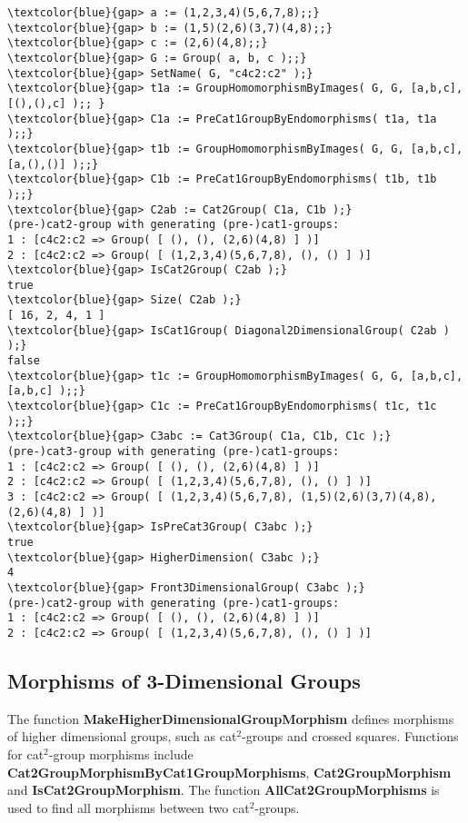 \documentclass[a4paper,11pt]{article}
\theoremstyle{plain}
\theoremstyle{definition}
\begin{document}
\begin{Verbatim}[frame=single, fontsize=\small, commandchars=\\\{\}]
\textcolor{blue}{gap> a := (1,2,3,4)(5,6,7,8);;}
\textcolor{blue}{gap> b := (1,5)(2,6)(3,7)(4,8);;}
\textcolor{blue}{gap> c := (2,6)(4,8);;}
\textcolor{blue}{gap> G := Group( a, b, c );;}
\textcolor{blue}{gap> SetName( G, "c4c2:c2" );}
\textcolor{blue}{gap> t1a := GroupHomomorphismByImages( G, G, [a,b,c], [(),(),c] );; }
\textcolor{blue}{gap> C1a := PreCat1GroupByEndomorphisms( t1a, t1a );;}
\textcolor{blue}{gap> t1b := GroupHomomorphismByImages( G, G, [a,b,c], [a,(),()] );;}
\textcolor{blue}{gap> C1b := PreCat1GroupByEndomorphisms( t1b, t1b );;}
\textcolor{blue}{gap> C2ab := Cat2Group( C1a, C1b );}
(pre-)cat2-group with generating (pre-)cat1-groups:
1 : [c4c2:c2 => Group( [ (), (), (2,6)(4,8) ] )]
2 : [c4c2:c2 => Group( [ (1,2,3,4)(5,6,7,8), (), () ] )]
\textcolor{blue}{gap> IsCat2Group( C2ab );}
true
\textcolor{blue}{gap> Size( C2ab );}
[ 16, 2, 4, 1 ]
\textcolor{blue}{gap> IsCat1Group( Diagonal2DimensionalGroup( C2ab ) );} 
false
\textcolor{blue}{gap> t1c := GroupHomomorphismByImages( G, G, [a,b,c], [a,b,c] );;}
\textcolor{blue}{gap> C1c := PreCat1GroupByEndomorphisms( t1c, t1c );;}
\textcolor{blue}{gap> C3abc := Cat3Group( C1a, C1b, C1c );}
(pre-)cat3-group with generating (pre-)cat1-groups:
1 : [c4c2:c2 => Group( [ (), (), (2,6)(4,8) ] )]
2 : [c4c2:c2 => Group( [ (1,2,3,4)(5,6,7,8), (), () ] )]
3 : [c4c2:c2 => Group( [ (1,2,3,4)(5,6,7,8), (1,5)(2,6)(3,7)(4,8),
(2,6)(4,8) ] )]
\textcolor{blue}{gap> IsPreCat3Group( C3abc );}
true
\textcolor{blue}{gap> HigherDimension( C3abc );}
4
\textcolor{blue}{gap> Front3DimensionalGroup( C3abc );} 
(pre-)cat2-group with generating (pre-)cat1-groups:
1 : [c4c2:c2 => Group( [ (), (), (2,6)(4,8) ] )]
2 : [c4c2:c2 => Group( [ (1,2,3,4)(5,6,7,8), (), () ] )]
\end{Verbatim}


\subsection{Morphisms of 3-Dimensional Groups}

The function \textbf{MakeHigherDimensionalGroupMorphism} defines morphisms of 
higher dimensional groups, such as cat$^{2}$-groups and crossed squares. 
Functions for cat$^{2}$-group morphisms include 
\textbf{Cat2GroupMorphismByCat1GroupMorphisms}, \textbf{Cat2GroupMorphism} and 
\textbf{IsCat2GroupMorphism}. 
The function \textbf{AllCat2GroupMorphisms} is used to find 
all morphisms between two cat$^{2}$-groups.
\end{document}
